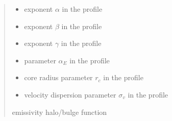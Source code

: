 \documentclass[letterpaper,10pt,english]{sphinxmanual}
\begin{document}
\begin{fulllineitems}
\begin{quote}
\begin{description}
\begin{itemize}
\item {} 
\sphinxAtStartPar
{} \textendash{} exponent \(\alpha\) in the {\hyperref[\detokenize{diffsph.profiles:diffsph.profiles.templates.hdz}]{}} profile

\item {} 
\sphinxAtStartPar
{} \textendash{} exponent \(\beta\) in the {\hyperref[\detokenize{diffsph.profiles:diffsph.profiles.templates.hdz}]{}} profile

\item {} 
\sphinxAtStartPar
{} \textendash{} exponent \(\gamma\) in the {\hyperref[\detokenize{diffsph.profiles:diffsph.profiles.templates.hdz}]{}} profile

\item {} 
\sphinxAtStartPar
{} \textendash{} parameter \(\alpha_E\) in the {\hyperref[\detokenize{diffsph.profiles:diffsph.profiles.templates.enst}]{}} profile

\item {} 
\sphinxAtStartPar
{} \textendash{} core radius parameter \(r_c\) in the {\hyperref[\detokenize{diffsph.profiles:diffsph.profiles.templates.cnfw}]{}} profile

\item {} 
\sphinxAtStartPar
{} \textendash{} velocity dispersion parameter \(\sigma_v\) in the {\hyperref[\detokenize{diffsph.profiles:diffsph.profiles.templates.sis}]{}} profile

\end{itemize}

\sphinxAtStartPar
emissivity halo/bulge function

\end{description}\end{quote}

\end{fulllineitems}
\end{document}
